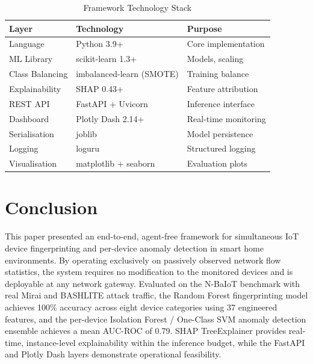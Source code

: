\documentclass[conference]{IEEEtran}
\begin{document}
\begin{table}[htbp]
\caption{Framework Technology Stack}
\label{tab:stack}
\centering
\renewcommand{\arraystretch}{1.2}
\begin{tabular}{l l l}
\toprule
\textbf{Layer}         & \textbf{Technology}    & \textbf{Purpose} \\
\midrule
Language               & Python 3.9+            & Core implementation \\
ML Library             & scikit-learn 1.3+      & Models, scaling \\
Class Balancing        & imbalanced-learn (SMOTE) & Training balance \\
Explainability         & SHAP 0.43+             & Feature attribution \\
REST API               & FastAPI + Uvicorn      & Inference interface \\
Dashboard              & Plotly Dash 2.14+      & Real-time monitoring \\
Serialisation          & joblib                 & Model persistence \\
Logging                & loguru                 & Structured logging \\
Visualisation          & matplotlib + seaborn   & Evaluation plots \\
\bottomrule
\end{tabular}
\end{table}

\section{Conclusion}
\label{sec:conclusion}

This paper presented an end-to-end, agent-free framework for simultaneous
IoT device fingerprinting and per-device anomaly detection in smart home
environments. By operating exclusively on passively observed network flow
statistics, the system requires no modification to the monitored devices and
is deployable at any network gateway. Evaluated on the N-BaIoT benchmark
with real Mirai and BASHLITE attack traffic, the Random Forest fingerprinting
model achieves 100\% accuracy across eight device categories using 37
engineered features, and the per-device Isolation Forest / One-Class SVM
anomaly detection ensemble achieves a mean AUC-ROC of 0.79. SHAP
TreeExplainer provides real-time, instance-level explainability within the
inference budget, while the FastAPI and Plotly Dash layers demonstrate
operational feasibility.
\end{document}
